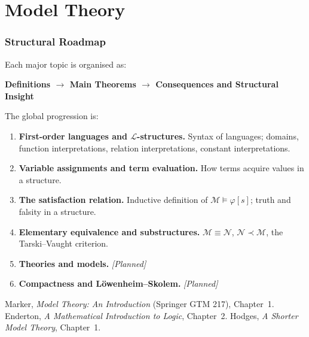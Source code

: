 
\chapter{Model Theory}




\subsection*{Structural Roadmap}

Each major topic is organised as:
\begin{center}
\textbf{Definitions $\longrightarrow$ Main Theorems
$\longrightarrow$ Consequences and Structural Insight}
\end{center}

The global progression is:
\begin{enumerate}
  \item \textbf{First-order languages and $\mathcal{L}$-structures.}
        Syntax of languages; domains, function interpretations, relation
        interpretations, constant interpretations.
  \item \textbf{Variable assignments and term evaluation.}
        How terms acquire values in a structure.
  \item \textbf{The satisfaction relation.}
        Inductive definition of $\mathcal{M} \models \varphi[s]$;
        truth and falsity in a structure.
  \item \textbf{Elementary equivalence and substructures.}
        $\mathcal{M} \equiv \mathcal{N}$, $\mathcal{N} \prec \mathcal{M}$,
        the Tarski--Vaught criterion.
  \item \textbf{Theories and models.} \textit{[Planned]}
  \item \textbf{Compactness and L\"{o}wenheim--Skolem.} \textit{[Planned]}
\end{enumerate}

\begin{remark}
Marker, \textit{Model Theory: An Introduction} (Springer GTM 217),
Chapter~1. Enderton, \textit{A Mathematical Introduction to Logic},
Chapter~2. Hodges, \textit{A Shorter Model Theory}, Chapter~1.
\end{remark}

